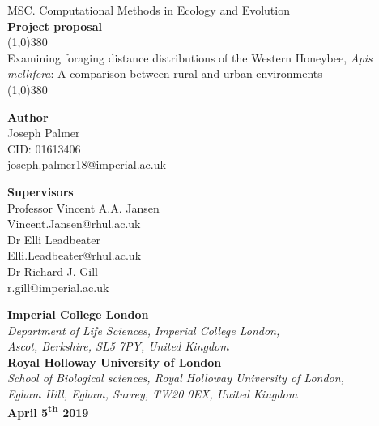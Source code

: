 \documentclass[11pt,usenames,dvipsnames]{article}
\begin{document}
\begin{titlepage}
\begin{center}
	\large{MSC. Computational Methods in Ecology and Evolution }\\
	\textbf{ Project proposal }\\[0cm]
	\huge{\line(1,0){380}\\
		Examining foraging distance distributions of the Western Honeybee, \textit{Apis mellifera}: A comparison between rural and urban environments\\
	\line(1,0){380}}\\[2cm]
\end{center}


\begin{minipage}[t]{0.5\textwidth}
\begin{flushleft}
	\Large{\textbf{Author}}\\
	\large{ Joseph Palmer\\
		CID: 01613406}\\
	joseph.palmer18@imperial.ac.uk\\[1cm]	
\end{flushleft}
\end{minipage}
\begin{minipage}[t]{0.5\textwidth}
\begin{flushright}
	\Large{\textbf{Supervisors}}\\
	\large{ Professor Vincent A.A. Jansen}\\
	Vincent.Jansen@rhul.ac.uk\\
	\large{Dr Elli Leadbeater}\\
	Elli.Leadbeater@rhul.ac.uk\\
	\large{Dr Richard J. Gill}\\
	r.gill@imperial.ac.uk
\end{flushright}
\end{minipage}

\vspace{1cm}
\begin{center}
	\large{\textbf{Imperial College London }}\\[0.2cm]
	\large{\textit{Department of Life Sciences, Imperial College London,}\\
		\textit{Ascot, Berkshire, SL5 7PY, United Kingdom}}\\[1cm]
	
	\large{\textbf{Royal Holloway University of London }}\\[0.2cm]
	\large{\textit{School of Biological sciences, Royal Holloway University of London,\\
			Egham Hill, Egham, Surrey, TW20 0EX, United Kingdom}}\\[1cm]
	\textbf{April 5\textsuperscript{th} 2019}
\end{center}

\end{titlepage}
\newpage
\tableofcontents
\newpage
\end{document}
